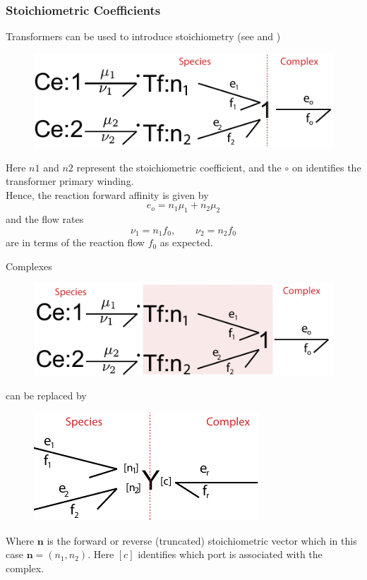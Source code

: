 \documentclass[10pt,reqno]{beamer}
\begin{document}
\begin{frame}
\frametitle{Stoichiometric Coefficients}
Transformers can be used to introduce stoichiometry (see \cite{Oster:1973aa} and \cite{Gawthrop:2014aa})
\begin{figure}
	\includegraphics[scale=0.5]{images/stoic_oster}
\end{figure}
Here $n1$ and $n2$ represent the stoichiometric coefficient, and the $\circ$ on identifies the transformer primary winding.\\
Hence, the reaction forward affinity is given by
\[
e_o = n_1\mu_1 + n_2 \mu_2
\]
and the flow rates 
\[
\nu_1 = n_1f_0,\qquad \nu_2 = n_2f_0
\]
are in terms of the reaction flow $f_0$ as expected.
\end{frame}
\begin{frame}{Complexes}
\begin{center}
	\begin{figure}
		\includegraphics[scale=0.5]{images/stoic_oster_Y}
	\end{figure}
can be replaced by
\end{center}
\begin{figure}
\includegraphics[scale=0.5]{images/stoic_Y}
\end{figure}
Where $\mathbf{n}$ is the forward or reverse (truncated) stoichiometric vector which in this case $\mathbf{n} = (n_1,n_2)$.
Here $[c]$ identifies which port is associated with the complex.
\end{frame}
\end{document}
